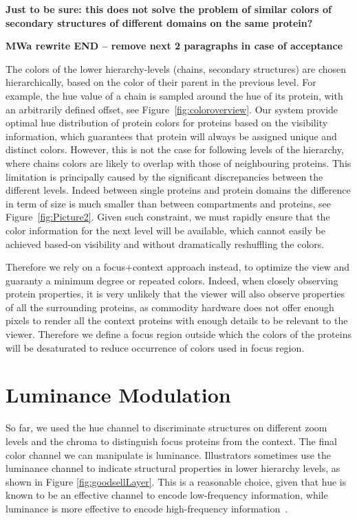 \documentclass[review,journal]{vgtc}         %
\begin{document}
\textbf{Just to be sure: this does not solve the problem of similar colors of secondary structures of different domains on the same protein?}

\textbf{MWa rewrite END -- remove next 2 paragraphs in case of acceptance}

The colors of the lower hierarchy-levels (chains, secondary structures) are chosen hierarchically, based on the color of their parent in the previous level.
For example, the hue value of a chain is sampled around the hue of its protein, with an arbitrarily defined offset, see Figure~\ref{fig:coloroverview}.
Our system provide optimal hue distribution of protein colors for proteins based on the visibility information, which guarantees that protein will always be assigned unique and distinct colors.
However, this is not the case for following levels of the hierarchy, where chains colors are likely to overlap with those of neighbouring proteins.  
This limitation is principally caused by the significant discrepancies between the different levels.
Indeed between single proteins and protein domains the difference in term of size is much smaller than between compartments and proteins, see Figure~\ref{fig:Picture2}.
Given such constraint, we must rapidly ensure that the color information for the next level will be available, which cannot easily be achieved based-on visibility and without dramatically reshuffling the colors.

Therefore we rely on a focus+context approach instead, to optimize the view and guaranty a minimum degree or repeated colors.
Indeed, when closely observing protein properties, it is very unlikely that the viewer will also observe properties of all the surrounding proteins, as commodity hardware does not offer enough pixels to render all the context proteins with enough details to be relevant to the viewer.
Therefore we define a focus region outside which the colors of the proteins will be desaturated to reduce occurrence of colors used in focus region.

\section{Luminance Modulation}

So far, we used the hue channel to discriminate structures on different zoom levels and the chroma to distinguish focus proteins from the context. 
The final color channel we can manipulate is luminance. 
Illustrators sometimes use the luminance channel to indicate structural properties in lower hierarchy levels, as shown in Figure \ref{fig:goodsellLayer}. 
This is a reasonable choice, given that hue is known to be an effective channel to encode low-frequency information, while luminance is more effective to encode high-frequency information~\cite{bergman1995rule}. 
\end{document}
